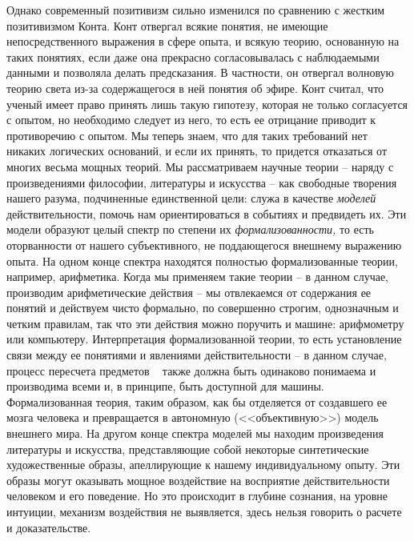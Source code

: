 \documentclass{book}
\begin{document}
Однако современный позитивизм сильно изменился по срав­нению с жестким позитивизмом Конта. Конт отвергал всякие понятия, не имеющие непосредственного выражения в сфере опыта, и всякую теорию, основанную на таких понятиях, если даже она прекрасно согласовывалась с наблюдаемыми данными и позволяла делать предсказания. В частности, он отвергал волновую теорию света из-за содержащегося в ней понятия об эфире. Конт считал, что ученый имеет право принять лишь такую гипотезу, которая не только согласуется с опытом, но необходимо следует из него, то есть ее отрицание приводит к противоречию с опытом. Мы теперь знаем, что для таких требований нет никаких логических оснований, и если их принять, то придется отказаться от многих весьма мощных теорий. Мы рассматриваем научные теории -- наряду с произведениями философии, литературы и искусства -- как свободные творения нашего ра­зума, подчиненные единственной цели: служа в качестве \textit{моделей} действительности, помочь нам ориентироваться в событиях и предвидеть их. Эти 
модели образуют целый спектр по степени их \textit{формализованности,}  то есть оторванности от нашего субъек­тивного, не поддающегося внешнему выражению опыта. На од­ном конце спектра находятся полностью формализованные теории, например, арифметика. Когда мы применяем такие теории -- в данном случае, производим арифметические действия -- мы отвлекаемся от содержания ее понятий и действуем чисто формально, по совершенно строгим, однозначным и четким правилам, так что эти действия можно поручить и машине: арифмометру или компьютеру. Интерпретация формализованной теории, то есть установление связи между ее понятиями и явлениями действительности -- в данном случае, процесс пересчета предметов ~ также должна быть одинаково понимаема и производима всеми и, в принципе, быть доступной для машины. Формализованная теория, таким образом, как бы отделяется от создавшего ее мозга человека и превращается в автономную (<<объективную>>) модель внешнего мира. На другом конце спектра моделей мы находим произведения литературы и 
ис­кусства, представляющие собой некоторые синтетические художественные образы, апеллирующие к нашему индивидуальному опыту. Эти образы могут оказывать мощное воздействие на восприятие действительности человеком и его поведение. Но это происходит в глубине сознания, на уровне интуиции, механизм воздействия не выявляется, здесь нельзя говорить о расчете и доказательстве.
\end{document}
